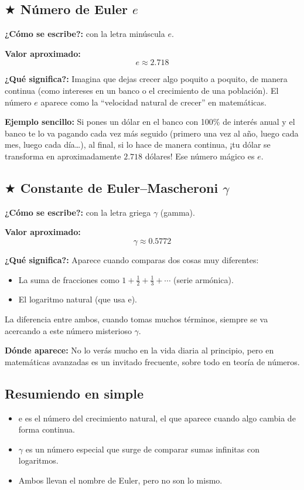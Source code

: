 \begin{extrabox}
\vspace{2ex}
\subsection*{$\bigstar$ \; Número de Euler $e$}
\textbf{¿Cómo se escribe?:} con la letra minúscula $e$.\par

\textbf{Valor aproximado:}
\[
e \approx 2.718
\]

\textbf{¿Qué significa?:}
Imagina que dejas crecer algo poquito a poquito, de manera continua (como intereses en un banco o 
el crecimiento de una población). El número $e$ aparece como la “velocidad natural de crecer” en matemáticas.

\textbf{Ejemplo sencillo:}
Si pones un dólar en el banco con 100\% de interés anual y el banco te lo va pagando cada vez más seguido 
(primero una vez al año, luego cada mes, luego cada día\ldots), al final, si lo hace de manera continua, 
¡tu dólar se transforma en aproximadamente $2.718$ dólares! Ese número mágico es $e$.

\vspace{2ex}
\subsection*{$\bigstar$ \; Constante de Euler–Mascheroni $\gamma$}
\textbf{¿Cómo se escribe?:} con la letra griega $\gamma$ (gamma).

\textbf{Valor aproximado:} 
\[
\gamma \approx 0.5772
\]

\textbf{¿Qué significa?:}
Aparece cuando comparas dos cosas muy diferentes:
\begin{itemize}
  \item La suma de fracciones como $1 + \tfrac{1}{2} + \tfrac{1}{3} + \cdots$ (serie armónica).
  \item El logaritmo natural (que usa $\mathrm{e}$).
\end{itemize}

La diferencia entre ambos, cuando tomas muchos términos, siempre se va acercando a este número misterioso $\gamma$.

\textbf{Dónde aparece:}
No lo verás mucho en la vida diaria al principio, pero en matemáticas avanzadas es un invitado frecuente, sobre todo en teoría de números.

\subsection*{Resumiendo en simple}
\begin{itemize}
  \item $\mathrm{e}$ es el número del crecimiento natural, el que aparece cuando algo cambia de forma continua.
  \item $\gamma$ es un número especial que surge de comparar sumas infinitas con logaritmos.
  \item Ambos llevan el nombre de Euler, pero no son lo mismo.
\end{itemize}
\end{extrabox}

